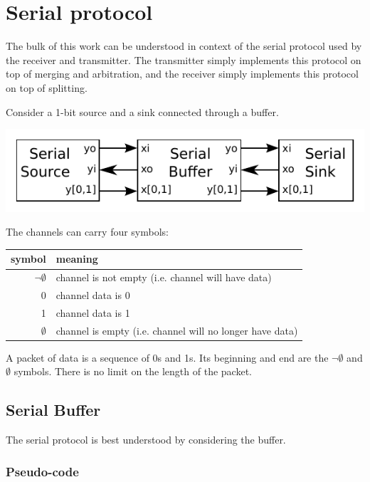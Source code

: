 \documentclass{article}
\begin{document}
\section{Serial protocol}

The bulk of this work can be understood in context of the serial protocol
used by the receiver and transmitter. 
The transmitter simply implements this protocol on top of merging and arbitration, 
and the receiver simply implements this protocol on top of splitting.

Consider a 1-bit source and a sink connected through a buffer.

\begin{center}
    \includegraphics[width=.5\textwidth]{img/serial_protocol_block_diagram.pdf}
\end{center}

\noindent
The channels can carry four symbols:

\begin{center}
    \begin{tabular}{r|l}
    \hline
    symbol & meaning \\ \hline
    $\neg\emptyset$ & channel is not empty (i.e. channel will have data) \\
    0 & channel data is 0 \\
    1 & channel data is 1 \\
    $\emptyset$ & channel is empty (i.e. channel will no longer have data) \\
    \hline
    \end{tabular}
\end{center}

A packet of data is a sequence of 0s and 1s. Its beginning and end are the 
$\neg\emptyset$ and $\emptyset$ symbols. There is no limit on the length of
the packet.

\subsection{Serial Buffer}

\noindent
The serial protocol is best understood by considering the buffer.

\subsubsection*{Pseudo-code}
\end{document}
